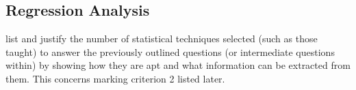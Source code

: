\subsection{Regression Analysis}\label{subsection}
list and justify the number of statistical techniques selected (such as those taught) to answer the previously outlined questions (or intermediate questions within) by showing how they are apt and what information can be extracted from them. This concerns marking criterion 2 listed later. 

